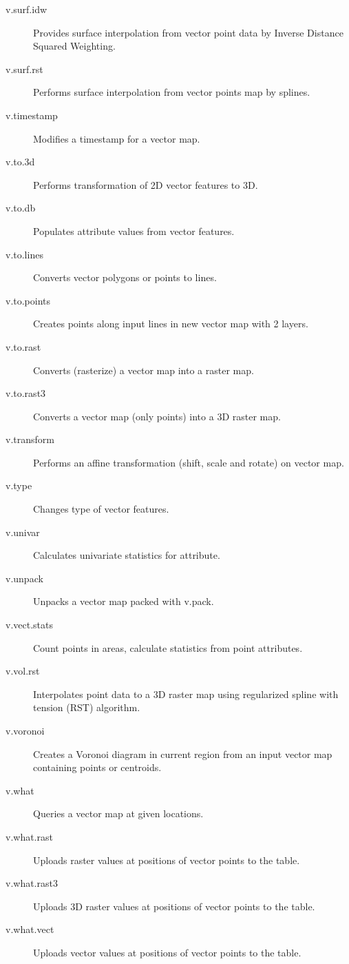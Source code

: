 \begin{description}
\item [{v.surf.idw}] Provides surface interpolation from vector point data
by Inverse Distance Squared Weighting.
\item [{v.surf.rst}] Performs surface interpolation from vector points
map by splines.
\item [{v.timestamp}] Modifies a timestamp for a vector map.
\item [{v.to.3d}] Performs transformation of 2D vector features to 3D.
\item [{v.to.db}] Populates attribute values from vector features.
\item [{v.to.lines}] Converts vector polygons or points to lines.
\item [{v.to.points}] Creates points along input lines in new vector map
with 2 layers.
\item [{v.to.rast}] Converts (rasterize) a vector map into a raster map.
\item [{v.to.rast3}] Converts a vector map (only points) into a 3D raster
map.
\item [{v.transform}] Performs an affine transformation (shift, scale and
rotate) on vector map.
\item [{v.type}] Changes type of vector features.
\item [{v.univar}] Calculates univariate statistics for attribute.
\item [{v.unpack}] Unpacks a vector map packed with v.pack.
\item [{v.vect.stats}] Count points in areas, calculate statistics from
point attributes.
\item [{v.vol.rst}] Interpolates point data to a 3D raster map using regularized
spline with tension (RST) algorithm.
\item [{v.voronoi}] Creates a Voronoi diagram in current region from an
input vector map containing points or centroids.
\item [{v.what}] Queries a vector map at given locations.
\item [{v.what.rast}] Uploads raster values at positions of vector points
to the table.
\item [{v.what.rast3}] Uploads 3D raster values at positions of vector
points to the table.
\item [{v.what.vect}] Uploads vector values at positions of vector points
to the table.\end{description}


